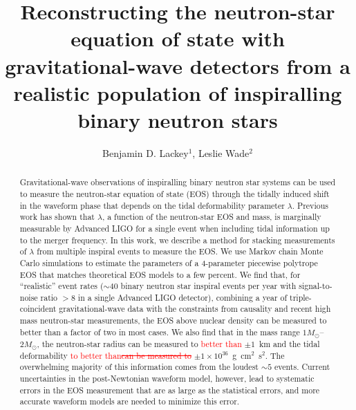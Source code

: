 \documentclass[twocolumn,prd,amssymb,aps,nofootinbib,showpacs,epsf]{revtex4}
\newcommand\ben[2]{\textcolor{red}{{#1}\sout{#2}}}
\begin{document}
\title{Reconstructing the neutron-star equation of state with gravitational-wave detectors from a realistic population of inspiralling binary neutron stars}

\author{Benjamin D. Lackey$^1$, Leslie Wade$^2$}


\begin{abstract}
Gravitational-wave observations of inspiralling binary neutron star systems can be used to measure the neutron-star equation of state (EOS) through the tidally induced shift in the waveform phase that depends on the tidal deformability parameter $\lambda$. Previous work has shown that $\lambda$, a function of the neutron-star EOS and mass, is marginally measurable by Advanced LIGO for a single event when including tidal information up to the merger frequency. In this work, we describe a method for stacking measurements of $\lambda$ from multiple inspiral events to measure the EOS. We use Markov chain Monte Carlo simulations to estimate the parameters of a 4-parameter piecewise polytrope EOS that matches theoretical EOS models to a few percent. We find that, for ``realistic'' event rates ($\sim 40$ binary neutron star inspiral events per year with signal-to-noise ratio $> 8$ in a single Advanced LIGO detector), combining a year of triple-coincident gravitational-wave data with the constraints from causality and recent high mass neutron-star measurements, the EOS above nuclear density can be measured to better than a factor of two in most cases. We also find that in the mass range $1M_\odot$--$2M_\odot$, the neutron-star radius can be measured to \ben{better than}{} $\pm 1$~km and the tidal deformability \ben{to better than}{can be measured to} $\pm 1 \times 10^{36}$~g~cm$^2$~s$^2$. The overwhelming majority of this information comes from the loudest $\sim 5$ events. Current uncertainties in the post-Newtonian waveform model, however, lead to systematic errors in the EOS measurement that are as large as the statistical errors, and more accurate waveform models are needed to minimize this error.
\end{abstract}

\end{document}
